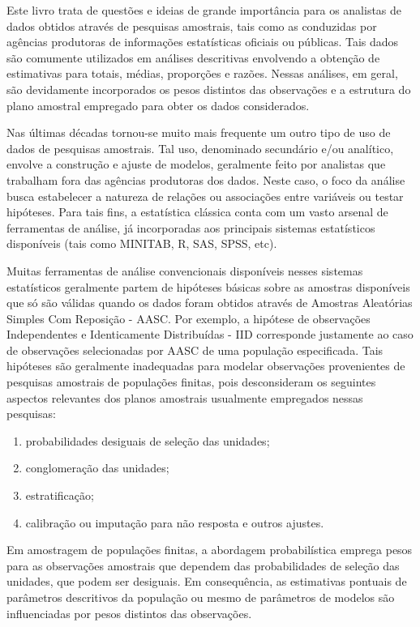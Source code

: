 \documentclass[
  12pt,
  brazilian,
]{book}
\theoremstyle{definition}
\theoremstyle{definition}
\theoremstyle{definition}
\theoremstyle{definition}
\theoremstyle{remark}
\begin{document}
Este livro trata de questões e ideias de grande importância para os analistas de dados obtidos através de pesquisas amostrais, tais como as conduzidas por agências produtoras de informações estatísticas oficiais ou públicas. Tais dados são comumente utilizados em análises descritivas envolvendo a obtenção de estimativas para totais, médias, proporções e razões. Nessas análises, em geral, são devidamente incorporados os pesos distintos das observações e a estrutura do plano amostral empregado para obter os dados considerados.

Nas últimas décadas tornou-se muito mais frequente um outro tipo de uso de dados de pesquisas amostrais. Tal uso, denominado secundário e/ou analítico, envolve a construção e ajuste de modelos, geralmente feito por analistas que trabalham fora das agências produtoras dos dados. Neste caso, o foco da análise busca estabelecer a natureza de relações ou associações entre variáveis ou testar hipóteses. Para tais fins, a estatística clássica conta com um vasto arsenal de ferramentas de análise, já incorporadas aos principais sistemas estatísticos disponíveis (tais como MINITAB, R, SAS, SPSS, etc).

Muitas ferramentas de análise convencionais disponíveis nesses sistemas estatísticos geralmente partem de hipóteses básicas sobre as amostras disponíveis que só são válidas quando os dados foram obtidos através de Amostras Aleatórias Simples Com Reposição - AASC. Por exemplo, a hipótese de observações Independentes e Identicamente Distribuídas - IID corresponde justamente ao caso de observações selecionadas por AASC de uma população especificada. Tais hipóteses são geralmente inadequadas para modelar observações provenientes de pesquisas amostrais de populações finitas, pois desconsideram os seguintes aspectos relevantes dos planos amostrais usualmente empregados nessas pesquisas:

\begin{enumerate}
\def\labelenumi{\roman{enumi}.}
\item
  probabilidades desiguais de seleção das unidades;
\item
  conglomeração das unidades;
\item
  estratificação;
\item
  calibração ou imputação para não resposta e outros ajustes.
\end{enumerate}

Em amostragem de populações finitas, a abordagem probabilística emprega pesos para as observações amostrais que dependem das probabilidades de seleção das unidades, que podem ser desiguais. Em consequência, as estimativas pontuais de parâmetros descritivos da população ou mesmo de parâmetros de modelos são influenciadas por pesos distintos das observações.
\end{document}
